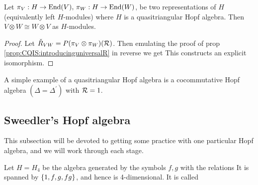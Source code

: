 \documentclass{article}
\begin{document}
\begin{prop}
Let $\pi_V:H \to \operatorname{End}(V), \, \pi_W:H\to \operatorname{End}(W)$, be two representations of $H$ (equivalently left $H$-modules) where $H$ is a quasitriangular Hopf algebra. Then $V \otimes W \cong W \otimes V$ as $H$-modules. 
\end{prop}
\begin{proof}
Let $\check{R}_{VW} = P(\pi_V \otimes \pi_W)(\mathcal{R})$. Then emulating the proof of prop \ref{prop:CQIS:introducinguniversalR} in reverse we get 
This constructs an explicit isomorphism. 
\end{proof}

\begin{example}
A simple example of a quasitriangular Hopf algebra is a cocommutative Hopf algebra $(\Delta = \Delta^\prime)$ with $\mathcal{R} = 1$. 
\end{example}

\subsection{Sweedler's Hopf algebra}
This subsection will be devoted to getting some practice with one particular Hopf algebra, and we will work through each stage. \\

\begin{definition}
Let $H=H_4$ be the algebra generated by the symbols $f,g$ with the relations
It is spanned by $\left\{ 1,f,g,fg \right\}$, and hence is 4-dimensional. It is called 
\end{definition}
\end{document}
